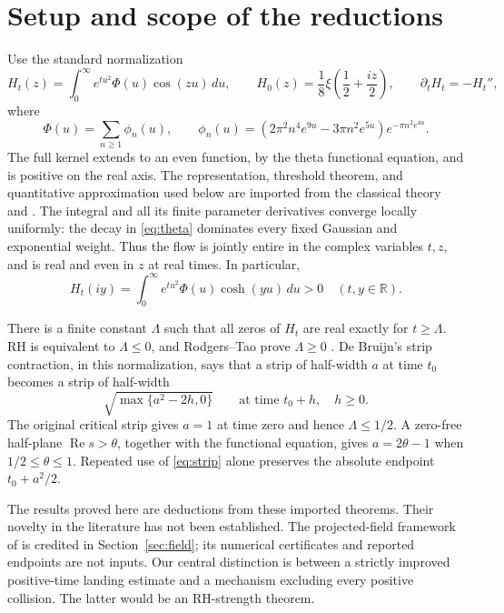 \documentclass[11pt]{article}
\numberwithin{equation}{section}
\theoremstyle{definition}
\theoremstyle{remark}
\DeclareMathOperator{\Rea}{Re}
\newcommand{\dd}{\,d}
\begin{document}
\section{Setup and scope of the reductions}
\label{sec:setup}
Use the standard normalization
\begin{equation}\label{eq:heat}
 H_t(z)=\int_0^\infty e^{tu^2}\Phi(u)\cos(zu)\dd u,
 \qquad H_0(z)=\frac18\xi\left(\frac12+\frac{iz}{2}\right),
 \qquad \partial_tH_t=-H_t'',
\end{equation}
where
\begin{equation}\label{eq:theta}
 \Phi(u)=\sum_{n\ge1}\phi_n(u),\qquad
 \phi_n(u)=(2\pi^2n^4e^{9u}-3\pi n^2e^{5u})
                    e^{-\pi n^2e^{4u}}.
\end{equation}
The full kernel extends to an even function, by the theta functional
equation, and is positive on the real axis. The representation, threshold
theorem, and quantitative approximation used below are imported from the
classical theory and \cite{polymath,newmanwu}. The integral and all its
finite parameter derivatives converge locally uniformly: the decay in
\eqref{eq:theta} dominates every fixed Gaussian and exponential weight.
Thus the flow is jointly entire in the complex variables $t,z$, and is real
and even in $z$ at real times. In particular,
\begin{equation}\label{eq:imaginarypositive}
 H_t(iy)=\int_0^\infty e^{tu^2}\Phi(u)\cosh(yu)\dd u>0
 \quad(t,y\in\mathbb R).
\end{equation}

There is a finite constant $\Lambda$ such that all zeros of $H_t$ are real
exactly for $t\ge\Lambda$. RH is equivalent to $\Lambda\le0$, and
Rodgers--Tao prove $\Lambda\ge0$ \cite{rodgerstao}. De Bruijn's strip
contraction, in this normalization, says that a strip of half-width $a$
at time $t_0$ becomes a strip of half-width
\begin{equation}\label{eq:strip}
 \sqrt{\max\{a^2-2h,0\}}\qquad\text{at time }t_0+h,
 \quad h\ge0.
\end{equation}
The original critical strip gives $a=1$ at time zero and hence
$\Lambda\le1/2$. A zero-free half-plane $\Rea s>\theta$, together with
the functional equation, gives $a=2\theta-1$ when $1/2\le\theta\le1$.
Repeated use of \eqref{eq:strip} alone preserves the absolute endpoint
$t_0+a^2/2$.

The results proved here are deductions from these imported theorems.
Their novelty in the literature has not been established. The
projected-field framework of \cite{planat} is credited in
Section~\ref{sec:field}; its numerical certificates and reported endpoints
are not inputs. Our central distinction is between a strictly improved
positive-time landing estimate and a mechanism excluding every positive
collision. The latter would be an RH-strength theorem.
\end{document}
